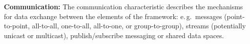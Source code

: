 \documentclass[conference,final]{IEEEtran}
\newcommand{\alnote}[1]{ {\textcolor{blue} { ***andre: #1 }}}
\newcommand{\alnote}[1]{}
\begin{document}

% 




\textbf{Communication:} The communication characteristic describes the
mechanisms for data exchange between the elements of the framework:
e.\,g.\ messages (point-to-point, all-to-all, one-to-all, all-to-one,
or group-to-group), streams (potentially unicast or multicast),
publish/subscribe messaging or shared data spaces.
		
\end{document}
